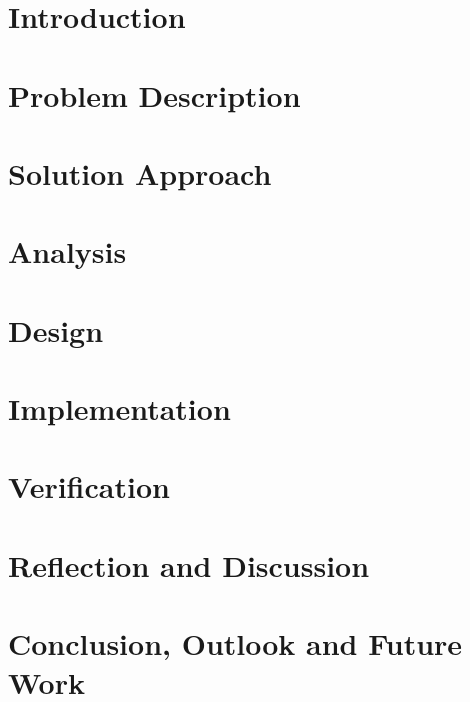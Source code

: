 
\section{Introduction} \label{sec:intro}


\section{Problem Description} \label{sec:probdesc}


\section{Solution Approach} \label{sec:solapp}


%

\section{Analysis} \label{sec:analysis}


\section{Design} \label{sec:design}


\section{Implementation} \label{sec:impl}


\section{Verification} \label{sec:verif}


\section{Reflection and Discussion} \label{sec:reflect}


\section{Conclusion, Outlook and Future Work} \label{sec:conclusion}




\label{sec:ref}
\label{EndOfMainMatter}
\newpage

